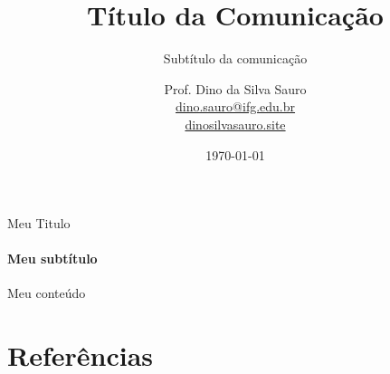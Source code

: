\documentclass[10pt]{beamer}
\begin{document}
\title[11ª Semana da Licenciatura em Matemática]{Título da Comunicação}
\subtitle{Subtítulo da comunicação}
\date{\today}
\author[Dino Sauro]{Prof. Dino da Silva Sauro\\\scriptsize{
    \href{mailto:dino.sauro@ifg.edu.br}{dino.sauro@ifg.edu.br}\\
    \href{URL}{dinosilvasauro.site}	
}}

\frame{\titlepage}


\begin{frame}{Meu Titulo}
\framesubtitle{Meu subtítulo}
	Meu conteúdo
\end{frame}

\section{Referências}

\end{document}
